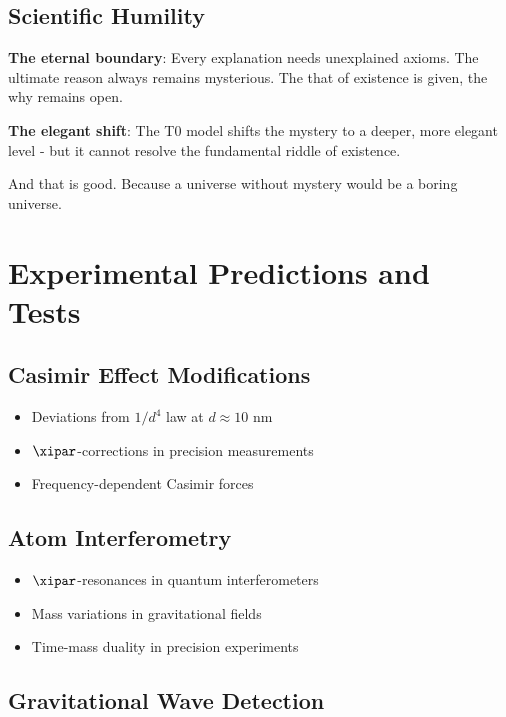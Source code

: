 	\subsection{Scientific Humility}
	
	\textbf{The eternal boundary}:
	Every explanation needs unexplained axioms. The ultimate reason always remains mysterious. The that of existence is given, the why remains open.
	
	\textbf{The elegant shift}:
	The T0 model shifts the mystery to a deeper, more elegant level - but it cannot resolve the fundamental riddle of existence.
	
	And that is good. Because a universe without mystery would be a boring universe.
	
	\section{Experimental Predictions and Tests}
	
	\subsection{Casimir Effect Modifications}
	
	\begin{itemize}
		\item Deviations from $1/d^4$ law at $d \approx 10$ nm
		\item $\xipar$-corrections in precision measurements
		\item Frequency-dependent Casimir forces
	\end{itemize}
	
	\subsection{Atom Interferometry}
	
	\begin{itemize}
		\item $\xipar$-resonances in quantum interferometers
		\item Mass variations in gravitational fields
		\item Time-mass duality in precision experiments
	\end{itemize}
	
	\subsection{Gravitational Wave Detection}
	
